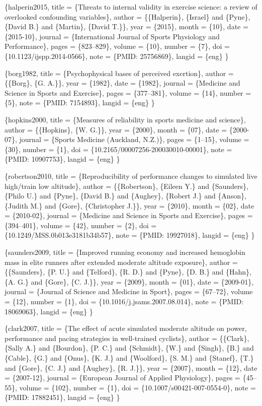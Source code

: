 \documentclass[
]{book}
\begin{document}
\citet{article}\{halperin2015,
title = \{Threats to internal validity in exercise science: a review of overlooked confounding variables\},
author = \{\{Halperin\}, \{Israel\} and \{Pyne\}, \{David B.\} and \{Martin\}, \{David T.\}\},
year = \{2015\},
month = \{10\},
date = \{2015-10\},
journal = \{International Journal of Sports Physiology and Performance\},
pages = \{823--829\},
volume = \{10\},
number = \{7\},
doi = \{10.1123/ijspp.2014-0566\},
note = \{PMID: 25756869\},
langid = \{eng\}
\}

\citet{article}\{borg1982,
title = \{Psychophysical bases of perceived exertion\},
author = \{\{Borg\}, \{G. A.\}\},
year = \{1982\},
date = \{1982\},
journal = \{Medicine and Science in Sports and Exercise\},
pages = \{377--381\},
volume = \{14\},
number = \{5\},
note = \{PMID: 7154893\},
langid = \{eng\}
\}

\citet{article}\{hopkins2000,
title = \{Measures of reliability in sports medicine and science\},
author = \{\{Hopkins\}, \{W. G.\}\},
year = \{2000\},
month = \{07\},
date = \{2000-07\},
journal = \{Sports Medicine (Auckland, N.Z.)\},
pages = \{1--15\},
volume = \{30\},
number = \{1\},
doi = \{10.2165/00007256-200030010-00001\},
note = \{PMID: 10907753\},
langid = \{eng\}
\}

\citet{article}\{robertson2010,
title = \{Reproducibility of performance changes to simulated live high/train low altitude\},
author = \{\{Robertson\}, \{Eileen Y.\} and \{Saunders\}, \{Philo U.\} and \{Pyne\}, \{David B.\} and \{Aughey\}, \{Robert J.\} and \{Anson\}, \{Judith M.\} and \{Gore\}, \{Christopher J.\}\},
year = \{2010\},
month = \{02\},
date = \{2010-02\},
journal = \{Medicine and Science in Sports and Exercise\},
pages = \{394--401\},
volume = \{42\},
number = \{2\},
doi = \{10.1249/MSS.0b013e3181b34b57\},
note = \{PMID: 19927018\},
langid = \{eng\}
\}

\citet{article}\{saunders2009,
title = \{Improved running economy and increased hemoglobin mass in elite runners after extended moderate altitude exposure\},
author = \{\{Saunders\}, \{P. U.\} and \{Telford\}, \{R. D.\} and \{Pyne\}, \{D. B.\} and \{Hahn\}, \{A. G.\} and \{Gore\}, \{C. J.\}\},
year = \{2009\},
month = \{01\},
date = \{2009-01\},
journal = \{Journal of Science and Medicine in Sport\},
pages = \{67--72\},
volume = \{12\},
number = \{1\},
doi = \{10.1016/j.jsams.2007.08.014\},
note = \{PMID: 18069063\},
langid = \{eng\}
\}

\citet{article}\{clark2007,
title = \{The effect of acute simulated moderate altitude on power, performance and pacing strategies in well-trained cyclists\},
author = \{\{Clark\}, \{Sally A.\} and \{Bourdon\}, \{P. C.\} and \{Schmidt\}, \{W.\} and \{Singh\}, \{B.\} and \{Cable\}, \{G.\} and \{Onus\}, \{K. J.\} and \{Woolford\}, \{S. M.\} and \{Stanef\}, \{T.\} and \{Gore\}, \{C. J.\} and \{Aughey\}, \{R. J.\}\},
year = \{2007\},
month = \{12\},
date = \{2007-12\},
journal = \{European Journal of Applied Physiology\},
pages = \{45--55\},
volume = \{102\},
number = \{1\},
doi = \{10.1007/s00421-007-0554-0\},
note = \{PMID: 17882451\},
langid = \{eng\}
\}
\end{document}
